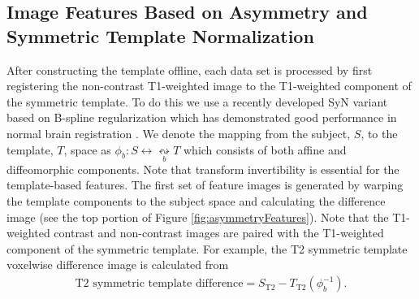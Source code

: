 \documentclass[preprint,authoryear,review,12pt]{elsarticle}
\begin{document}

\subsection{Image Features Based on Asymmetry and Symmetric Template Normalization}

After constructing the template offline, each data set is processed
by first registering the non-contrast T1-weighted image to the T1-weighted
component of the symmetric template.  To do this we use a recently developed 
SyN \citep{avants2011a} variant based on B-spline regularization 
which has demonstrated good performance in normal brain registration \citep{tustison2013a}.
We denote the mapping from the subject, $S$, to the template, $T$,
space as $\phi_b: S \leftrightarrow \underset{b}{\leftrightsquigarrow}  T$
which consists of both affine and diffeomorphic components.  Note that transform
invertibility is essential for the template-based features.  The first 
set of feature images is generated by warping the template components 
to the subject space and calculating the difference image (see the 
top portion of Figure \ref{fig:asymmetryFeatures}).  
Note that the T1-weighted contrast and non-contrast images are paired with
the T1-weighted component of the symmetric template.
For example,
the T2 symmetric template voxelwise difference image is calculated from
\begin{align}
  \mathrm{T2}\,\,\mathrm{symmetric}\,\,\mathrm{template}\,\,\mathrm{difference} = S_{\mathrm{T2}} - T_{\mathrm{T2}}\left(\phi_b^{-1}\right).
\end{align}
\end{document}
